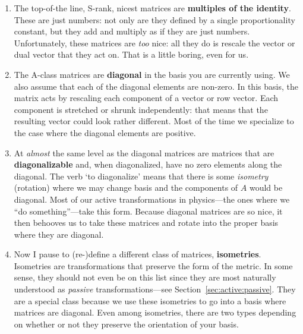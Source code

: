 \documentclass[12pt, oneside]{report}    %
\begin{document}
\begin{enumerate}
    \item The top-of-the line, S-rank, nicest matrices are \textbf{multiples of the identity}. These are just numbers: not only are they defined by a single proportionality constant, but they add and multiply as if they are just numbers. Unfortunately, these matrices are \emph{too} nice: all they do is rescale the vector or dual vector that they act on. That is a little boring, even for us.
    \item The A-class matrices are \textbf{diagonal} in the basis you are currently using. We also assume that each of the diagonal elements are non-zero. In this basis, the matrix acts by rescaling each component of a vector or row vector. Each component is stretched or shrunk independently: that means that the resulting vector could look rather different. Most of the time we specialize to the case where the diagonal elements are positive.
    \item At \emph{almost} the same level as the diagonal matrices are matrices that are \textbf{diagonalizable} and, when diagonalized, have no zero elements along the diagonal. The verb `to diagonalize' means that there is some \emph{isometry} (rotation) where we may change basis and the components of $A$ would be diagonal. Most of our active transformations in physics---the ones where we ``do something''---take this form. Because diagonal matrices are so nice, it then behooves us to take these matrices and rotate into the proper basis where they are diagonal.
    \item Now I pause to (re-)define a different class of matrices, \textbf{isometries}. Isometries are transformations that preserve the form of the metric. In some sense, they should not even be on this list since they are most naturally understood as \emph{passive} transformations---see Section~\ref{sec:active:passive}. They are a special class because we use these isometries to go into a basis where matrices are diagonal. Even among isometries, there are two types depending on whether or not they preserve the orientation of your basis.

\end{enumerate}
\end{document}

